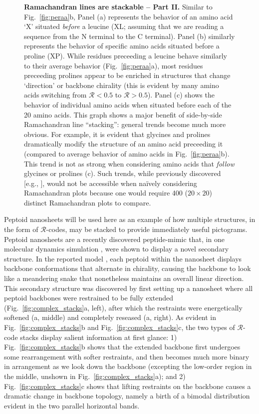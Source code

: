 \documentclass[fleqn,10pt,lineno]{wlpeerj} %
\newcommand{\Fig}[1]{Fig.~\ref{#1}}
\newcommand{\rr}{$\mathcal{R}$\xspace}
\begin{document}
\begin{figure}
\begin{adjustwidth}{-1in}{0in}
\caption{\textbf{Ramachandran lines are stackable -- Part II.} Similar to \Fig{fig:peraa}b, Panel (a) represents the behavior of an amino acid `X' situated {\it before} a leucine (XL; assuming that we are reading a sequence from the N terminal to the C terminal). Panel (b) similarly represents the behavior of specific amino acids situated before a proline (XP). While residues preceeding a leucine behave similarly to their average behavior (\Fig{fig:peraa}a), most residues preceeding prolines appear to be enriched in structures that change `direction' or backbone chirality (this is evident by many amino acids switching from \rr$<0.5$ to \rr$>0.5$). Panel (c) shows the behavior of individual amino acids when situated before each of the 20 amino acids. This graph shows a major benefit of side-by-side Ramachandran line ``stacking'': general trends become much more obvious. For example, it is evident that glycines and prolines dramatically modify the structure of an amino acid preceeding it (compared to average behavior of amino acids in \Fig{fig:peraa}b). This trend is not as strong when considering amino acids that {\it follow} glycines or prolines (c). Such trends, while previously discovered [e.g., \cite{Gunasekaran1998,Ho2005}], would not be accessible when na{\"i}vely considering Ramachandran plots because one would require 400 ($20\times 20$) distinct Ramachandran plots to compare. %
\label{fig:motifs}}
\end{adjustwidth}
\end{figure}

Peptoid nanosheets \citep{Mannige2015} will be used here as an example of how multiple structures, in the form of \rr-codes, may be stacked to provide immediately useful pictograms. Peptoid nanosheets are a recently discovered peptide-mimic that, in one molecular dynamics simulation \citep{Mannige2015}, were shown to display a novel secondary structure. In the reported model \citep{Mannige2015}, each peptoid within the nanosheet displays backbone conformations that alternate in chirality, causing the backbone to look like a meandering snake that nonetheless maintains an overall linear direction. This secondary structure was discovered by first setting up a nanosheet where all peptoid backbones were restrained to be fully extended (\Fig{fig:complex_stacks}a, left), after which the restraints were energetically softened (a, middle) and completely reseased (a, right). As evident in \Fig{fig:complex_stacks}b and \Fig{fig:complex_stacks}c, the two types of \rr-code stacks display salient information at first glance: 1) \Fig{fig:complex_stacks}b shows that the extended backbone first undergoes some rearrangement with softer restraints, and then becomes much more binary in arrangement as we look down the backbone (excepting the low-order region in the middle, unshown in \Fig{fig:complex_stacks}a); and 2) \Fig{fig:complex_stacks}c shows that lifting restraints on the backbone causes a dramatic change in backbone topology, namely a birth of a bimodal distribution evident in the two parallel horizontal bands.
\end{document}
